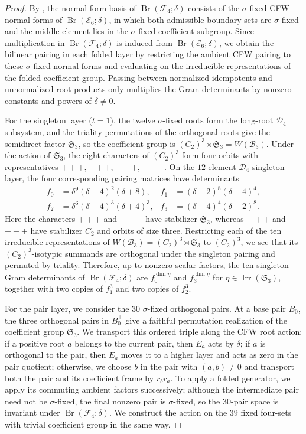 \documentclass[11pt,a4paper]{amsart}
\newcommand{\Br}{\operatorname{Br}}\newcommand{\Irr}{\operatorname{Irr}}
\theoremstyle{uprightdefinition}
\theoremstyle{remark}\newtheorem{remark}[theorem]{Remark}
\begin{document}
\begin{proof}
By \cite[Corollaries~5.1--5.2 and Theorem~6.5]{LiuF42013}, the normal-form basis of $\Br(\mathscr{F}_4;\delta)$ consists
of the $\sigma$-fixed CFW normal forms of $\Br(\mathscr{E}_6;\delta)$, in which both admissible boundary sets are
$\sigma$-fixed and the middle element lies in the $\sigma$-fixed coefficient subgroup.
Since multiplication in $\Br(\mathscr{F}_4;\delta)$ is induced from $\Br(\mathscr{E}_6;\delta)$, we obtain the bilinear pairing in each folded layer by restricting the ambient CFW pairing to these $\sigma$-fixed normal forms and evaluating on the irreducible representations of the folded coefficient group. Passing between normalized idempotents and unnormalized root products
only multiplies the Gram determinants by nonzero constants and powers of $\delta\ne0$.

For the singleton layer ($t=1$), the twelve $\sigma$-fixed roots form the long-root $\mathscr{D}_4$
subsystem, and the triality permutations of the orthogonal roots give the semidirect factor
$\mathfrak S_3$, so the coefficient group is
$(C_2)^3\rtimes\mathfrak S_3=W(\mathscr{B}_3)$.
Under the action of $\mathfrak S_3$, the eight characters of $(C_2)^3$ form four orbits with representatives
$+++,-++,--+,---$. On the $12$-element $\mathscr{D}_4$ singleton layer, the four corresponding pairing matrices
have determinants
\begin{align*}
 f_0&=\delta^9(\delta-4)^2(\delta+8),&
 f_1&=(\delta-2)^8(\delta+4)^4,\\
 f_2&=\delta^6(\delta-4)^3(\delta+4)^3,&
 f_3&=(\delta-4)^4(\delta+2)^8.
\end{align*}
Here the characters $+++$ and $---$ have stabilizer $\mathfrak S_3$, whereas $-++$ and $--+$
have stabilizer $C_2$ and orbits of size three.
Restricting each of the ten irreducible representations of $W(\mathscr{B}_3)=(C_2)^3\rtimes\mathfrak S_3$ to $(C_2)^3$, we see that its $(C_2)^3$-isotypic summands are orthogonal
under the singleton pairing and permuted by triality. Therefore, up to nonzero scalar factors, the ten singleton Gram determinants of $\Br(\mathscr{F}_4;\delta)$ are
$f_0^{\dim\eta}$ and $f_3^{\dim\eta}$ for
$\eta\in\operatorname{Irr}(\mathfrak S_3)$, together with two copies
of $f_1^3$ and two copies of $f_2^3$.

For the pair layer, we consider the $30$ $\sigma$-fixed orthogonal pairs. At a base
pair $B_0$, the three orthogonal pairs in $B_0^\perp$ give a faithful
permutation realization of the coefficient group $\mathfrak S_3$.
We transport this ordered triple along the CFW root action: if a positive
root $a$ belongs to the current pair, then $E_a$ acts by $\delta$;
if $a$ is orthogonal to the pair, then $E_a$ moves it to a higher layer and acts as
zero in the pair quotient; otherwise, we choose $b$ in the pair with
$(a,b)\ne0$ and transport both the pair and its coefficient frame by
$r_b r_a$. To apply a folded generator, we apply its
commuting ambient factors successively; although the intermediate pair need not be
$\sigma$-fixed, the final nonzero pair is $\sigma$-fixed, so the $30$-pair space is
invariant under $\Br(\mathscr{F}_4;\delta)$. We construct the action on the $39$
fixed four-sets with trivial coefficient group in the same way.


\end{proof}
\end{document}
